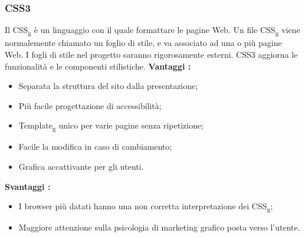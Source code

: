 {{		\subsubsection{CSS3}{
			Il CSS\textsubscript{g} è un linguaggio con il quale formattare le pagine Web. Un file CSS\textsubscript{g} viene normalemente chiamato un foglio di stile, e va associato ad una o più pagine Web. I fogli di stile nel progetto saranno rigorosamente esterni. CSS3 aggiorna le funzionalità e le componenti stilistiche.
			\textbf{Vantaggi :}
			\begin{itemize}\itemsep1pt
				\item Separata la struttura del sito dalla presentazione;
				\item Più facile progettazione di accessibilità;
				\item Template\textsubscript{g} unico per varie pagine senza ripetizione;
				\item Facile la modifica in caso di cambiamento;
				\item Grafica accattivante per gli utenti.
			\end{itemize}
			\textbf{Svantaggi :}
			\begin{itemize}\itemsep1pt
				\item I browser più datati hanno una non corretta interpretazione dei CSS\textsubscript{g};
				\item Maggiore attenzione sulla psicologia di marketing grafico posta verso l'utente.
			\end{itemize}
		}
}}
